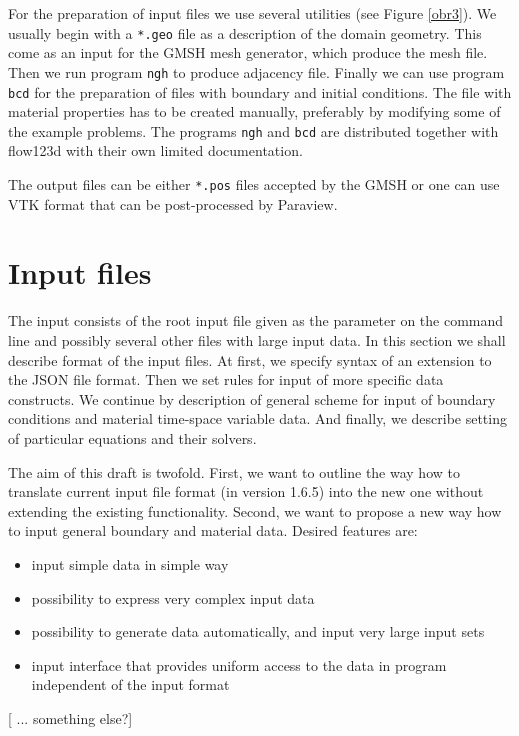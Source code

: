\documentclass[12pt,a4paper]{report}
\begin{document}
For the preparation of input files we use several utilities (see Figure \ref{obr3}). 
We usually begin with a \verb'*.geo' file as a description of the domain geometry. This come as an input for the GMSH mesh generator, which produce 
the mesh file. Then we run program \verb'ngh' to produce adjacency file. Finally we can use program \verb'bcd' for the preparation of files with
boundary and initial conditions. The file with material properties has to be created manually, preferably by modifying some of the example problems.
The programs \verb'ngh' and \verb'bcd' are distributed together with flow123d with their own limited documentation.

The output files can be either \verb'*.pos' files accepted by the GMSH or one can use VTK format that can be post-processed by Paraview.
















\chapter{Input files}
The input consists of the root input file given as the parameter on the command line and possibly several other 
files with large input data. In this section we shall describe format of the input files. At first, we specify syntax of
an extension to the JSON file format. Then we set rules for input of more specific data constructs. We continue by description of general scheme for input of
boundary conditions and material time-space variable data. And finally, we describe setting of particular equations and their solvers.

The aim of this draft is twofold. First, we want to outline the way how to translate current input file format (in version 1.6.5) into the new one without extending 
the existing functionality. Second, we want to propose a new way how to input general boundary and material data. Desired features are:
\begin{itemize}
 \item input simple data in simple way
 \item possibility to express very complex input data 
 \item possibility to generate data automatically, and input very large input sets
 \item input interface that provides uniform access to the data in program independent of the input format
\end{itemize}
[ ... something else?]
\end{document}
